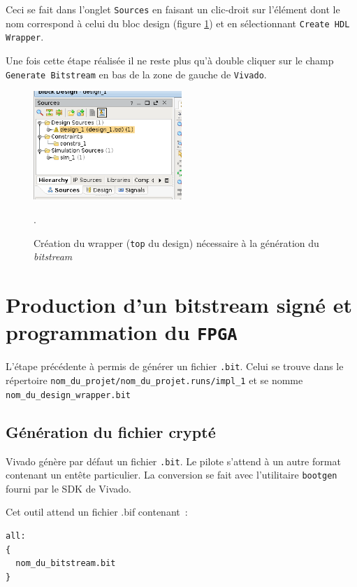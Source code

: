 \documentclass[12pt,oneside]{article}
\begin{document}
Ceci se fait dans l'onglet {\tt Sources} en faisant un clic-droit sur
l'\'el\'ement dont le nom correspond \`a celui du bloc design (figure
\ref{createHDLWrapper}) et en s\'electionnant {\tt Create HDL Wrapper}.

Une fois cette \'etape r\'ealis\'ee il ne reste plus qu'\`a double cliquer sur
le champ {\tt Generate Bitstream} en bas de la zone de gauche de {\tt Vivado}.

\begin{figure}[h!tb]
\begin{center}
\includegraphics[width=0.5\textwidth]{createHDLWrapper}
\end{center}
\caption{Cr\'eation du wrapper ({\tt top} du design) n\'ecessaire \`a la
g\'en\'eration du {\em bitstream}}.
\label{createHDLWrapper}
\end{figure}

\section{Production d'un bitstream sign\'e et programmation du {\tt FPGA}}

L'\'etape pr\'ec\'edente \`a permis de g\'en\'erer un fichier {\tt .bit}. Celui
se trouve dans le r\'epertoire
{\tt nom\_du\_projet/nom\_du\_projet.runs/impl\_1} et se nomme {\tt nom\_du\_design\_wrapper.bit}
\subsection{G\'en\'eration du fichier crypt\'e}

Vivado g\'en\`ere par d\'efaut un fichier {\tt .bit}.
Le pilote s'attend \`a un autre format contenant un ent\^ete particulier. La conversion
se fait avec l'utilitaire {\tt bootgen} fourni par le SDK de Vivado.

Cet outil attend un fichier .bif contenant~:
\begin{lstlisting}
all:
{
  nom_du_bitstream.bit
}
\end{lstlisting}
\end{document}
